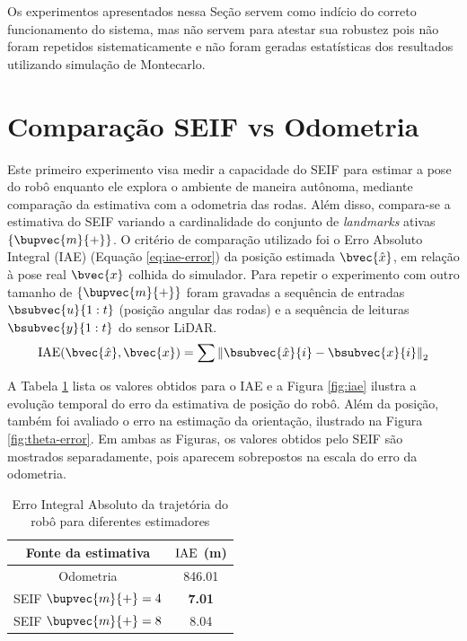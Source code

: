Os experimentos apresentados nessa Seção servem como indício do correto 
funcionamento do sistema, mas não servem para atestar sua robustez pois 
não foram repetidos sistematicamente e não foram geradas estatísticas 
dos resultados utilizando simulação de Montecarlo.

\section{Comparação SEIF vs Odometria}
\label{sec:exp-estimate-comparison}
Este primeiro experimento visa medir a capacidade do SEIF para estimar a 
pose do robô enquanto ele explora o ambiente de maneira autônoma, 
mediante comparação da estimativa 
com a odometria das rodas. Além disso, compara-se a estimativa do SEIF 
variando a cardinalidade do conjunto de \textit{landmarks} 
ativas $\{\bupvec{m}{+}\}$. O critério de comparação utilizado foi o 
Erro Absoluto Integral (IAE) (Equação \ref{eq:iae-error}) da posição estimada $\bvec{\hat{x}}$, em 
relação à pose real $\bvec{x}$ colhida do simulador. Para repetir o experimento com outro tamanho de $\{\bupvec{m}{+}\}$ foram gravadas a sequência de entradas $\bsubvec{u}{1:t}$ 
(posição angular das rodas) e a sequência de leituras $\bsubvec{y}{1:t}$ 
do sensor LiDAR.
\begin{equation}
  \IAE(\bvec{\hat{x}}, \bvec{x}) = \sum{
    \left\Vert \bsubvec{\hat{x}}{i} - \bsubvec{x}{i} \right\Vert_2
  }
  \label{eq:iae-error}
\end{equation}

A Tabela \ref{table:iae} lista os valores obtidos para o IAE e a Figura \ref{fig:iae} ilustra a evolução 
temporal do erro da estimativa de posição do robô. Além 
da posição, também foi avaliado o erro na estimação da 
orientação, ilustrado na Figura \ref{fig:theta-error}. Em ambas as 
Figuras, os valores obtidos pelo SEIF são mostrados separadamente, pois aparecem sobrepostos na escala do erro da odometria.

\begin{table}[]
\caption{Erro Integral Absoluto da trajetória do robô para diferentes estimadores}
\label{table:iae}
\center
\begin{tabular}{cc}
\hline
Fonte da estimativa & $\operatorname{IAE}$ (m) \\ \hline
Odometria & 846.01 \\
SEIF $\bupvec{m}{+} = 4$ & \textbf{7.01 }\\
SEIF $\bupvec{m}{+} = 8$ & 8.04 \\ \hline
\end{tabular}
\end{table}

